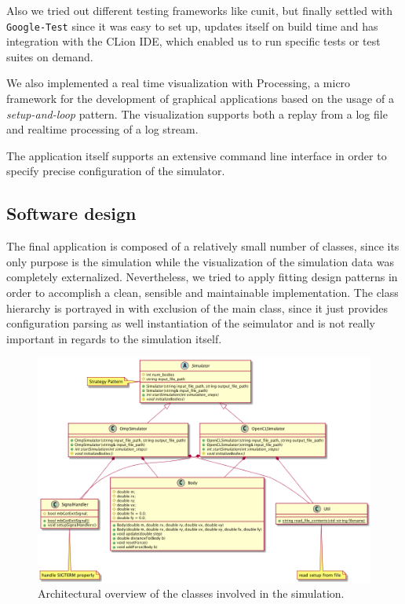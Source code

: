 \documentclass[a4paper,11pt]{scrartcl} %
\begin{document}
Also we tried out different testing frameworks like cunit, but finally settled with \texttt{Google-Test} since it was easy to set up, updates itself on build time and has integration with the CLion IDE, which enabled us to run specific tests or test suites on demand.

We also implemented a real time visualization with Processing, a micro framework for the development of graphical applications based on the usage of a \textit{setup-and-loop} pattern. The visualization supports both a replay from a log file and realtime processing of a log stream.

The application itself supports an extensive command line interface in order to specify precise configuration of the simulator.

\subsection{Software design}
\label{software_design}
The final application is composed of a relatively small number of classes, since its only purpose is the simulation while the visualization of the simulation data was completely externalized. Nevertheless, we tried to apply fitting design patterns in order to accomplish a clean, sensible and maintainable implementation. The class hierarchy is portrayed in \cite{fig:classes} with exclusion of the main class, since it just provides configuration parsing as well instantiation of the seimulator and is not really important in regards to the simulation itself.

\begin{figure}[h!]
	\centering
	\includegraphics[width=\textwidth]{img/classes.png}
	\caption{Architectural overview of the classes involved in the simulation.}
	\label{fig:classes}
\end{figure}
\end{document}
